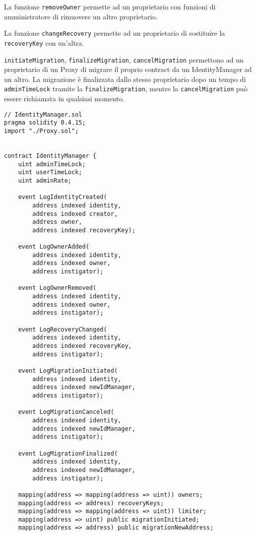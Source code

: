 \begin{itemize}
  La funzione \texttt{removeOwner} permette ad un proprietario con funzioni di
  amministratore di rimuovere un altro proprietario.

  La funzione \texttt{changeRecovery} permette ad un proprietario di sostituire
  la \texttt{recoveryKey} con un'altra.

  \texttt{initiateMigration}, \texttt{finalizeMigration}, \texttt{cancelMigration} permettono ad un
  proprietario di un Proxy di migrare il proprio contract da un IdentityManager ad un altro.
  La migrazione è finalizzata dallo stesso proprietario dopo un tempo di \texttt{adminTimeLock} tramite
  la \texttt{finalizeMigration}, mentre la \texttt{cancelMigration} può essere richiamata in qualsiasi
  momento.

  \begin{lstlisting}[language=Solidity, numbers=none]
// IdentityManager.sol
pragma solidity 0.4.15;
import "./Proxy.sol";


contract IdentityManager {
    uint adminTimeLock;
    uint userTimeLock;
    uint adminRate;

    event LogIdentityCreated(
        address indexed identity,
        address indexed creator,
        address owner,
        address indexed recoveryKey);

    event LogOwnerAdded(
        address indexed identity,
        address indexed owner,
        address instigator);

    event LogOwnerRemoved(
        address indexed identity,
        address indexed owner,
        address instigator);

    event LogRecoveryChanged(
        address indexed identity,
        address indexed recoveryKey,
        address instigator);

    event LogMigrationInitiated(
        address indexed identity,
        address indexed newIdManager,
        address instigator);

    event LogMigrationCanceled(
        address indexed identity,
        address indexed newIdManager,
        address instigator);

    event LogMigrationFinalized(
        address indexed identity,
        address indexed newIdManager,
        address instigator);

    mapping(address => mapping(address => uint)) owners;
    mapping(address => address) recoveryKeys;
    mapping(address => mapping(address => uint)) limiter;
    mapping(address => uint) public migrationInitiated;
    mapping(address => address) public migrationNewAddress;


\end{lstlisting}
\end{itemize}
